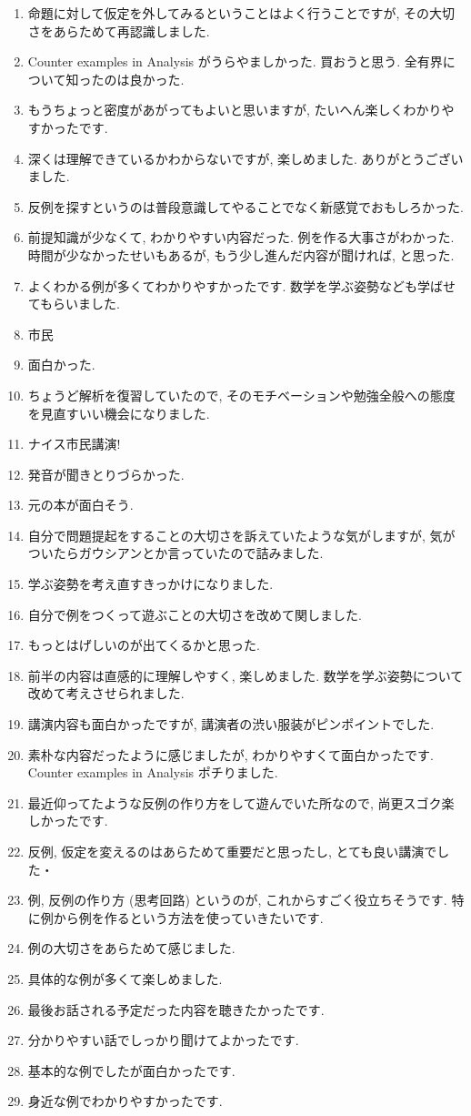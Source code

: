 \documentclass[openany, a4paper, oneside]{jsbook}
\begin{document}
\begin{enumerate}
\item 命題に対して仮定を外してみるということはよく行うことですが, その大切さをあらためて再認識しました.
\item Counter examples in Analysis がうらやましかった. 買おうと思う. 全有界について知ったのは良かった.
\item もうちょっと密度があがってもよいと思いますが, たいへん楽しくわかりやすかったです.
\item 深くは理解できているかわからないですが, 楽しめました. ありがとうございました.
\item 反例を探すというのは普段意識してやることでなく新感覚でおもしろかった.
\item 前提知識が少なくて, わかりやすい内容だった. 例を作る大事さがわかった. 時間が少なかったせいもあるが, もう少し進んだ内容が聞ければ, と思った.
\item よくわかる例が多くてわかりやすかったです. 数学を学ぶ姿勢なども学ばせてもらいました.
\item 市民
\item 面白かった.
\item ちょうど解析を復習していたので, そのモチベーションや勉強全般への態度を見直すいい機会になりました.
\item ナイス市民講演!
\item 発音が聞きとりづらかった.
\item 元の本が面白そう.
\item 自分で問題提起をすることの大切さを訴えていたような気がしますが, 気がついたらガウシアンとか言っていたので詰みました.
\item 学ぶ姿勢を考え直すきっかけになりました.
\item 自分で例をつくって遊ぶことの大切さを改めて関しました.
\item もっとはげしいのが出てくるかと思った.
\item 前半の内容は直感的に理解しやすく, 楽しめました. 数学を学ぶ姿勢について改めて考えさせられました.
\item 講演内容も面白かったですが, 講演者の渋い服装がピンポイントでした.
\item 素朴な内容だったように感じましたが, わかりやすくて面白かったです. Counter examples in Analysis ポチりました.
\item 最近仰ってたような反例の作り方をして遊んでいた所なので, 尚更スゴク楽しかったです.
\item 反例, 仮定を変えるのはあらためて重要だと思ったし, とても良い講演でした・
\item 例, 反例の作り方 (思考回路) というのが, これからすごく役立ちそうです. 特に例から例を作るという方法を使っていきたいです.
\item 例の大切さをあらためて感じました.
\item 具体的な例が多くて楽しめました.
\item 最後お話される予定だった内容を聴きたかったです.
\item 分かりやすい話でしっかり聞けてよかったです.
\item 基本的な例でしたが面白かったです.
\item 身近な例でわかりやすかったです.
\end{enumerate}
\end{document}

